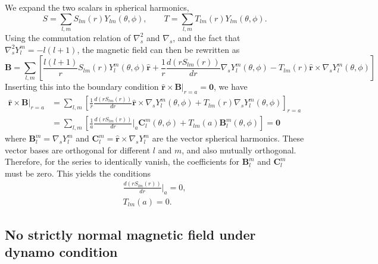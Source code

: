 \documentclass[a4paper, 11pt]{article}
\begin{document}
We expand the two scalars in spherical harmonics,
\begin{equation}
    S = \sum_{l,m} S_{lm}(r) Y_{lm}(\theta, \phi),\qquad 
    T = \sum_{l,m} T_{lm}(r) Y_{lm}(\theta, \phi).
\end{equation}
Using the commutation relation of $\nabla_s^2$ and $\nabla_s$, and the fact that $\nabla_s^2 Y_l^m = -l(l+1)$, the magnetic field can then be rewritten as
\begin{equation}
    \mathbf{B} = \sum_{l,m} \left[\frac{l(l+1)}{r} S_{lm}(r) Y_l^m(\theta, \phi) \hat{\mathbf{r}} + 
    \frac{1}{r}\frac{d(rS_{lm}(r))}{dr} \nabla_s Y_l^m(\theta, \phi) - T_{lm}(r) \hat{\mathbf{r}}\times \nabla_s Y_l^m(\theta, \phi)\right]
\end{equation}
Inserting this into the boundary condition $\hat{\mathbf{r}}\times \mathbf{B}|_{r=a} = \mathbf{0}$, we have
\begin{equation}
\begin{aligned}
    \hat{\mathbf{r}}\times \mathbf{B}|_{r=a} &= \sum_{l,m} \left[\frac{1}{r}\frac{d(rS_{lm}(r))}{dr} \hat{\mathbf{r}}\times \nabla_s Y_l^m(\theta, \phi) + T_{lm}(r) \nabla_s Y_l^m(\theta, \phi) \right]_{r=a} \\ 
    &= \sum_{l,m} \left[\frac{1}{a}\frac{d(rS_{lm}(r))}{dr}\Big|_{a} \mathbf{C}_l^m(\theta, \phi) + T_{lm}(a) \mathbf{B}_l^m(\theta, \phi) \right] = \mathbf{0}
\end{aligned}
\end{equation}
where $\mathbf{B}_l^m = \nabla_s Y_l^m$ and $\mathbf{C}_l^m = \hat{\mathbf{r}}\times \nabla_s Y_l^m$ are the vector spherical harmonics. These vector bases are orthogonal for different $l$ and $m$, and also mutually orthogonal. Therefore, for the series to identically vanish, the coefficients for $\mathbf{B}_l^m$ and $\mathbf{C}_l^m$ must be zero. This yields the conditions
\begin{equation}\label{eqn:cond-normal}
\begin{aligned}
    \frac{d(rS_{lm}(r))}{dr}\Big|_{a} = 0, \\ 
    T_{lm}(a) = 0.
\end{aligned}
\end{equation}


\subsection{No strictly normal magnetic field under dynamo condition}
\end{document}
